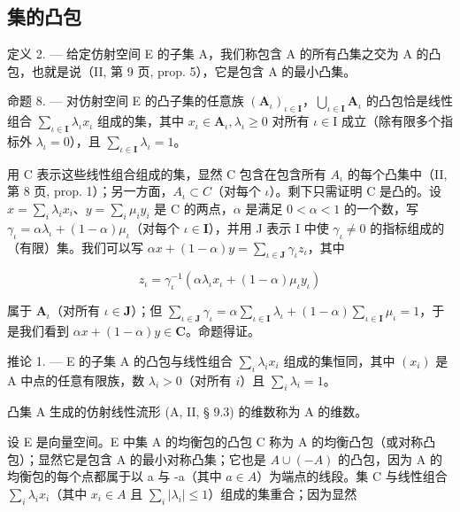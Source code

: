 \subsection{集的凸包}

定义 2. --- 给定仿射空间 E 的子集 A，我们称包含 A 的所有凸集之交为 A 的凸包，也就是说（II, 第 9 页, prop. 5），它是包含 A 的最小凸集。

命题 8. --- 对仿射空间 E 的凸子集的任意族 \((\mathbf{A}_{\iota})_{\iota \in \mathbf{I}}\)，\(\bigcup_{\iota \in \mathbf{I}}\mathbf{A}_{\iota}\) 的凸包恰是线性组合 \(\sum_{\iota \in \mathbf{I}}\lambda_{\iota}x_{\iota}\) 组成的集，其中 \(x_{\iota}\in \mathbf{A}_{\iota},\lambda_{\iota}\geqslant 0\) 对所有 \(\iota \in \mathrm{I}\) 成立（除有限多个指标外 \(\lambda_{\iota} = 0\)），且 \(\sum_{\iota \in \mathbf{I}}\lambda_{\iota} = 1\)。

用 C 表示这些线性组合组成的集，显然 C 包含在包含所有 \(A_{\iota}\) 的每个凸集中（II, 第 8 页, prop. 1）；另一方面，\(A_{\iota} \subset C\)（对每个 \(\iota\)）。剩下只需证明 C 是凸的。设 \(x = \sum_{i} \lambda_{i} x_{i}\)、\(y = \sum_{i} \mu_{i} y_{i}\) 是 C 的两点，\(\alpha\) 是满足 \(0 < \alpha < 1\) 的一个数，写 \(\gamma_{\iota} = \alpha \lambda_{\iota} + (1 - \alpha)\mu_{\iota}\)（对每个 \(\iota \in \mathbf{I}\)），并用 J 表示 I 中使 \(\gamma_{\iota} \neq 0\) 的指标组成的（有限）集。我们可以写 \(\alpha x + (1 - \alpha)y = \sum_{\iota \in \mathbf{J}}\gamma_{\iota}z_{\iota}\)，其中

\[
z _ {\iota} = \gamma_ {\iota} ^ {- 1} (\alpha \lambda_ {\iota} x _ {\iota} + (1 - \alpha) \mu_ {\iota} y _ {\iota})
\]

属于 \(\mathbf{A}_{\iota}\)（对所有 \(\iota \in \mathbf{J}\)）；但 \(\sum_{\iota \in \mathbf{J}} \gamma_{\iota} = \alpha \sum_{\iota \in \mathbf{I}} \lambda_{\iota} + (1 - \alpha) \sum_{\iota \in \mathbf{I}} \mu_{\iota} = 1\)，于是我们看到 \(\alpha x + (1 - \alpha)y \in \mathbf{C}\)。命题得证。

推论 1. --- E 的子集 A 的凸包与线性组合 \(\sum_{i} \lambda_{i} x_{i}\) 组成的集恒同，其中 \((x_{i})\) 是 A 中点的任意有限族，数 \(\lambda_{i} > 0\)（对所有 \(i\)）且 \(\sum_{i} \lambda_{i} = 1\)。

凸集 A 生成的仿射线性流形 (A, II, § 9.3) 的维数称为 A 的维数。

设 E 是向量空间。E 中集 A 的均衡包的凸包 C 称为 A 的均衡凸包（或对称凸包）；显然它是包含 A 的最小对称凸集；它也是 \(A \cup (-A)\) 的凸包，因为 A 的均衡包的每个点都属于以 a 与 -a（其中 \(a \in A\)）为端点的线段。集 C 与线性组合 \(\sum_{i} \lambda_{i} x_{i}\)（其中 \(x_{i} \in A\) 且 \(\sum_{i} |\lambda_{i}| \leqslant 1\)）组成的集重合；因为显然

